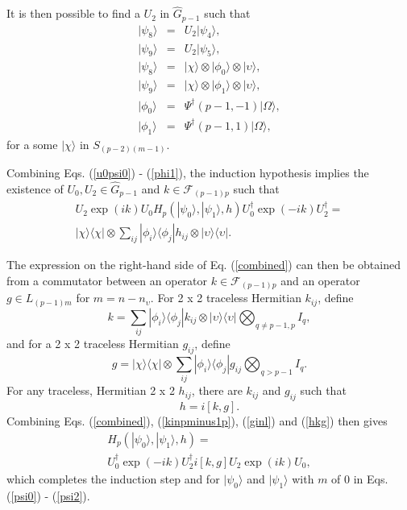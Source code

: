 \documentclass[12pt,amsmath,amssymb,onecolumn]{revtex4-2}
\begin{document}
It is then possible to find a $U_2$ in $\hat{G}_{p-1}$ such that
\begin{subequations}
\begin{eqnarray}
\label{u2psi4}
|\psi_8 \rangle  & = & U_2 |\psi_4 \rangle , \\
\label{u2psi5}
|\psi_9 \rangle  & = & U_2 |\psi_5 \rangle , \\
\label{psi6}
|\psi_8 \rangle  & = & | \chi \rangle  \otimes |\phi_0 \rangle  \otimes |\upsilon \rangle , \\
\label{psi7}
|\psi_9 \rangle  & = & | \chi \rangle  \otimes |\phi_1 \rangle  \otimes |\upsilon \rangle , \\
\label{phi0}
|\phi_0 \rangle  & = & \Psi^{\dagger}( p-1, -1) |\Omega \rangle , \\
\label{phi1}
|\phi_1 \rangle  & = & \Psi^{\dagger}( p-1, 1) |\Omega \rangle ,
\end{eqnarray}
\end{subequations}
for a some $|\chi \rangle $ in $S_{(p-2) (m-1)}$.



Combining Eqs. (\ref{u0psi0}) - (\ref{phi1}), the induction hypothesis
implies the existence of $U_0, U_2 \in \hat{G}_{p-1}$
and $k \in \mathcal{F}_{(p-1) p}$ such that
\begin{multline}
\label{combined}
U_2 \exp( i k) U_0 H_p( |\psi_0 \rangle , |\psi_1 \rangle , h) U_0^\dagger \exp( -i k) U_2^\dagger = \\
|\chi \rangle  \langle  \chi| \otimes \sum_{ij} |\phi_i \rangle  \langle \phi_j| h_{ij} \otimes |\upsilon \rangle  \langle \upsilon|.
\end{multline}

The expression on the right-hand side of Eq. (\ref{combined}) can then be obtained from a
commutator between an operator $k \in \mathcal{F}_{(p-1) p}$ and
an operator $g \in L_{(p-1) m}$ for $m = n - n_{\upsilon}$.
For 2 x 2 traceless Hermitian $k_{ij}$, define
\begin{equation}
\label{kinpminus1p}
k = \sum_{ij} |\phi_i \rangle  \langle \phi_j| k_{ij} \otimes |\upsilon \rangle  \langle \upsilon| \bigotimes_{q \ne p-1, p} I_q,
\end{equation}
and for a 2 x 2 traceless Hermitian $g_{ij}$, define
\begin{equation}
\label{ginl}
g  =  |\chi \rangle  \langle \chi| \otimes \sum_{ij} |\phi_i \rangle  \langle \phi_j| g_{ij} \bigotimes_{q > p-1} I_q.
\end{equation}
For any traceless, Hermitian 2 x 2 $h_{ij}$, there are $k_{ij}$ and $g_{ij}$ 
such that
\begin{equation}
\label{hkg}
h = i [ k, g].
\end{equation}
Combining Eqs. (\ref{combined}), (\ref{kinpminus1p}), (\ref{ginl}) and (\ref{hkg}) then gives
\begin{multline}
\label{endresult}
H_p( |\psi_0 \rangle , |\psi_1 \rangle , h) = \\ 
U_0^\dagger \exp(-ik) U_2^\dagger i[k, g] U_2 \exp(ik) U_0,
\end{multline}
which completes the induction step and for $|\psi_0 \rangle $ and $|\psi_1 \rangle $ with $m$ of 0
in Eqs. (\ref{psi0}) - (\ref{psi2}).
\end{document}
